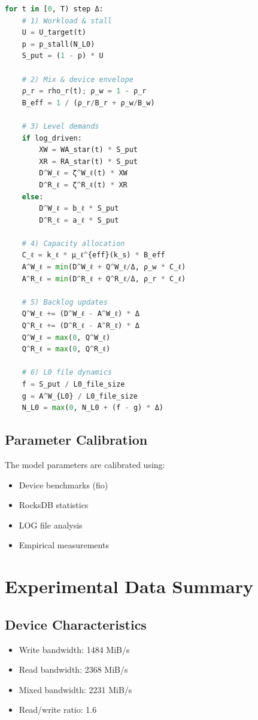 \documentclass[11pt,twocolumn]{article}
\begin{document}
\begin{lstlisting}[language=Python]
for t in [0, T) step Δ:
    # 1) Workload & stall
    U = U_target(t)
    p = p_stall(N_L0)
    S_put = (1 - p) * U
    
    # 2) Mix & device envelope
    ρ_r = rho_r(t); ρ_w = 1 - ρ_r
    B_eff = 1 / (ρ_r/B_r + ρ_w/B_w)
    
    # 3) Level demands
    if log_driven:
        XW = WA_star(t) * S_put
        XR = RA_star(t) * S_put
        D^W_ℓ = ζ^W_ℓ(t) * XW
        D^R_ℓ = ζ^R_ℓ(t) * XR
    else:
        D^W_ℓ = b_ℓ * S_put
        D^R_ℓ = a_ℓ * S_put
    
    # 4) Capacity allocation
    C_ℓ = k_ℓ * μ_ℓ^{eff}(k_s) * B_eff
    A^W_ℓ = min(D^W_ℓ + Q^W_ℓ/Δ, ρ_w * C_ℓ)
    A^R_ℓ = min(D^R_ℓ + Q^R_ℓ/Δ, ρ_r * C_ℓ)
    
    # 5) Backlog updates
    Q^W_ℓ += (D^W_ℓ - A^W_ℓ) * Δ
    Q^R_ℓ += (D^R_ℓ - A^R_ℓ) * Δ
    Q^W_ℓ = max(0, Q^W_ℓ)
    Q^R_ℓ = max(0, Q^R_ℓ)
    
    # 6) L0 file dynamics
    f = S_put / L0_file_size
    g = A^W_{L0} / L0_file_size
    N_L0 = max(0, N_L0 + (f - g) * Δ)
\end{lstlisting}

\subsection{Parameter Calibration}

The model parameters are calibrated using:
\begin{itemize}
    \item Device benchmarks (fio)
    \item RocksDB statistics
    \item LOG file analysis
    \item Empirical measurements
\end{itemize}

\section{Experimental Data Summary}

\subsection{Device Characteristics}
\begin{itemize}
    \item Write bandwidth: 1484 MiB/s
    \item Read bandwidth: 2368 MiB/s
    \item Mixed bandwidth: 2231 MiB/s
    \item Read/write ratio: 1.6
\end{itemize}
\end{document}
